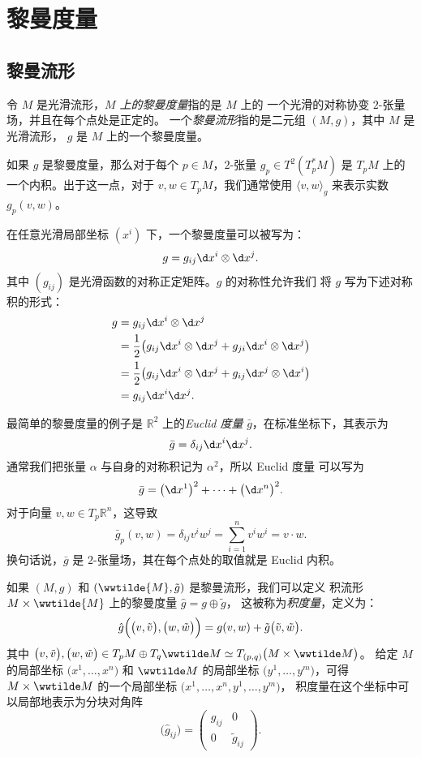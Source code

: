 

\chapter{黎曼度量}

\section{黎曼流形}

令 $M$ 是光滑流形，\emph{$M$ 上的黎曼度量}指的是 $M$ 上的
一个光滑的对称协变 $2$-张量场，并且在每个点处是正定的。
一个\emph{黎曼流形}指的是二元组 $(M,g)$，其中 $M$ 是光滑流形，
$g$ 是 $M$ 上的一个黎曼度量。

如果 $g$ 是黎曼度量，那么对于每个 $p\in M$，$2$-张量 $g_p\in T^2(T_p^*M)$
是 $T_pM$ 上的一个内积。出于这一点，对于 $v,w\in T_pM$，我们通常使用 $\langle v,w\rangle_g$
来表示实数 $g_p(v,w)$。

在任意光滑局部坐标 $\left(x^i\right)$ 下，一个黎曼度量可以被写为：
\[
  g=g_{ij}\d x^i\otimes \d x^j.  
\]
其中 $(g_{ij})$ 是光滑函数的对称正定矩阵。$g$ 的对称性允许我们
将 $g$ 写为下述对称积的形式：
\begin{align*}
  g&=g_{ij}\d x^i\otimes \d x^j\\
  &=\frac{1}{2}\bigl(g_{ij}\d x^i\otimes \d x^j+g_{ji}\d x^i\otimes \d x^j\bigr)\\
  &=\frac{1}{2}\bigl(g_{ij}\d x^i\otimes \d x^j+g_{ij}\d x^j\otimes \d x^i\bigr)\\
  &=g_{ij}\d x^i\d x^j.
\end{align*}

\begin{example}[Euclid 度量]
  最简单的黎曼度量的例子是 $\mathbb{R}^2$ 上的\emph{Euclid 度量}
  $\bar g$，在标准坐标下，其表示为
  \[
    \bar g=\delta_{ij}\d x^i\d x^j.  
  \]
  通常我们把张量 $\alpha$ 与自身的对称积记为 $\alpha^2$，所以 Euclid 度量
  可以写为
  \[
    \bar g = \bigl(\d x^1\bigr)^2+\cdots +\bigl(\d x^n\bigr)^2.
  \]
  对于向量 $v,w\in T_p \mathbb{R}^n$，这导致
  \[
    \bar g_p(v,w)=\delta_{ij}v^iw^j=\sum_{i=1}^nv^iw^i=v\cdot w.
  \]
  换句话说，$\bar g$ 是 $2$-张量场，其在每个点处的取值就是 Euclid 内积。
\end{example}

\begin{example}[积度量]
  如果 $(M,g)$ 和 $(\wwtilde{M},\tilde{g})$ 是黎曼流形，我们可以定义
  积流形 $M\times\wwtilde{M}$ 上的黎曼度量 $\hat g=g\oplus\tilde g$，
  这被称为\emph{积度量}，定义为：
  \[
    \hat g\Bigl(\bigl(v,\tilde v\bigr),\bigl(w,\tilde w\bigr)\Bigr)  
    =g(v,w)+\tilde g\bigl(\tilde v,\tilde w\bigr).
  \]
  其中 $\bigl(v,\tilde v\bigr),\bigl(w,\tilde w\bigr)\in T_pM\oplus T_q\wwtilde M\simeq T_{(p,q)}\bigl(M\times\wwtilde M\bigr)$。
  给定 $M$ 的局部坐标 $\bigl(x^1,\dots,x^n\bigr)$ 和 $\wwtilde M$
  的局部坐标 $\bigl(y^1,\dots,y^m\bigr)$，可得 $M\times \wwtilde M$
  的一个局部坐标 $\bigl(x^1,\dots,x^n,y^1,\dots,y^m\bigr)$，
  积度量在这个坐标中可以局部地表示为分块对角阵
  \[
    \bigl(\hat g_{ij}\bigr) =\begin{pmatrix}
      g_{ij} & 0 \\
      0 & \tilde g_{ij}
    \end{pmatrix}.
  \]
\end{example}

